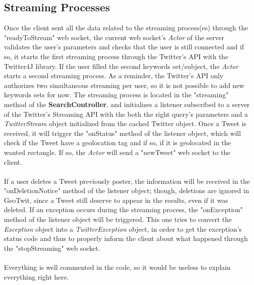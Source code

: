 \documentclass[a4paper,11pt]{report}
\begin{document}
\subsection{Streaming Processes}
Once the client sent all the data related to the streaming process(es) through the "readyToStream" web socket, the current web socket's \emph{Actor} of the server validates the user's parameters and checks that the user is still connected and if so, it starts the first streaming process through the Twitter's API with the Twitter4J library. If the user filled the second keywords set/subject, the \emph{Actor} starts a second streaming process. As a reminder, the Twitter's API only authorizes two simultaneous streaming per user, so it is not possible to add new keywords sets for now. The streaming process is located in the "streaming" method of the \textbf{SearchController}, and initializes a listener subscribed to a server of the Twitter's Streaming API with the both the right query's parameters and a \emph{TwitterStream} object initialized from the cached Twitter object. Once a Tweet is received, it will trigger the "onStatus" method of the listener object, which will check if the Tweet have a geolocation tag and if so, if it is geolocated in the wanted rectangle. If so, the \emph{Actor} will send a "newTweet" web socket to the client.\\\\
If a user deletes a Tweet previously poster, the information will be received in the "onDeletionNotice" method of the listener object; though, deletions are ignored in GeoTwit, since a Tweet still deserve to appear in the results, even if it was deleted. If an exception occurs during the streaming process, the "onException" method of the listener object will be triggered. This one tries to convert the \emph{Exception} object into a \emph{TwitterException} object, in order to get the exception's status code and thus to properly inform the client about what happened through the "stopStreaming" web socket.\\\\
Everything is well commented in the code, so it would be useless to explain everything right here.
\end{document}
